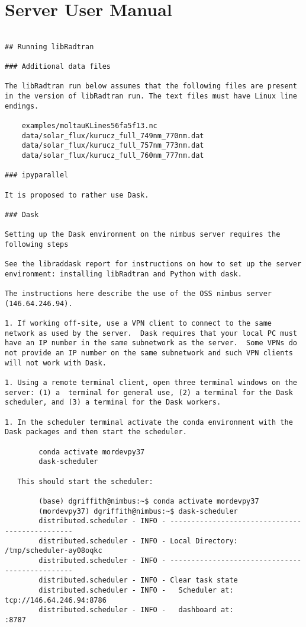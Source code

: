 

\chapter{Server User Manual}
\label{chap:ServerUserManual}

\begin{lstlisting}

## Running libRadtran

### Additional data files
 
The libRadtran run below assumes that the following files are present in the version of libRadtran run. The text files must have Linux line endings.

    examples/moltauKLines56fa5f13.nc
    data/solar_flux/kurucz_full_749nm_770nm.dat
    data/solar_flux/kurucz_full_757nm_773nm.dat
    data/solar_flux/kurucz_full_760nm_777nm.dat

### ipyparallel

It is proposed to rather use Dask.

### Dask

Setting up the Dask environment on the nimbus server requires the following steps

See the libraddask report for instructions on how to set up the server environment: installing libRadtran and Python with dask.

The instructions here describe the use of the OSS nimbus server (146.64.246.94).

1. If working off-site, use a VPN client to connect to the same network as used by the server.  Dask requires that your local PC must have an IP number in the same subnetwork as the server.  Some VPNs do not provide an IP number on the same subnetwork and such VPN clients will not work with Dask.

1. Using a remote terminal client, open three terminal windows on the server: (1) a  terminal for general use, (2) a terminal for the Dask scheduler, and (3) a terminal for the Dask workers.

1. In the scheduler terminal activate the conda environment with the Dask packages and then start the scheduler.

        conda activate mordevpy37
        dask-scheduler
        
   This should start the scheduler:
   
        (base) dgriffith@nimbus:~$ conda activate mordevpy37
        (mordevpy37) dgriffith@nimbus:~$ dask-scheduler
        distributed.scheduler - INFO - -----------------------------------------------
        distributed.scheduler - INFO - Local Directory:    /tmp/scheduler-ay08oqkc
        distributed.scheduler - INFO - -----------------------------------------------
        distributed.scheduler - INFO - Clear task state
        distributed.scheduler - INFO -   Scheduler at:  tcp://146.64.246.94:8786
        distributed.scheduler - INFO -   dashboard at:                     :8787


\end{lstlisting}
